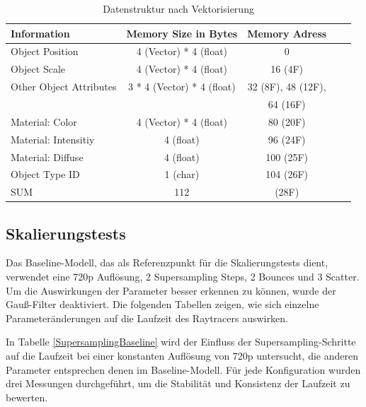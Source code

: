 \documentclass[sigconf]{acmart}
\begin{document}
\begin{table}[b]
 \caption{Datenstruktur nach Vektorisierung}

 \label{DatenstrukturVektorisierung}
 \centering
 \small
 \begin{tabular}[h]{lcccr}
  \toprule
  Information & Memory Size in Bytes & Memory Adress\\
  \midrule
  Object Position & 4 (Vector) * 4 (float) & 0\\
  Object Scale & 4 (Vector) * 4 (float) & 16 (4F)\\
  Other Object Attributes & 3 * 4 (Vector) * 4 (float) & 32 (8F), 48 (12F),\\
  & & 64 (16F)\\
  Material: Color & 4 (Vector) * 4 (float) & 80 (20F)\\
  Material: Intensitiy & 4 (float) & 96 (24F)\\
  Material: Diffuse & 4 (float) & 100 (25F)\\
  Object Type ID & 1 (char) & 104 (26F)\\
  \midrule
  SUM & 112 & (28F)\\
  \bottomrule
 \end{tabular}
\end{table}

\subsection{Skalierungstests}
Das Baseline-Modell, das als Referenzpunkt für die Skalierungstests dient, verwendet eine 720p Auflösung, 2 Supersampling Steps, 2 Bounces und 3 Scatter.
Um die Auswirkungen der Parameter besser erkennen zu können, wurde der Gauß-Filter deaktiviert.
Die folgenden Tabellen zeigen, wie sich einzelne Parameteränderungen auf die Laufzeit des Raytracers auswirken.

In Tabelle \ref{SupersamplingBaseline} wird der Einfluss der Supersampling-Schritte auf die Laufzeit bei einer konstanten Auflösung von 720p untersucht, die anderen Parameter entsprechen denen im Baseline-Modell.
Für jede Konfiguration wurden drei Messungen durchgeführt, um die Stabilität und Konsistenz der Laufzeit zu bewerten.
\end{document}
